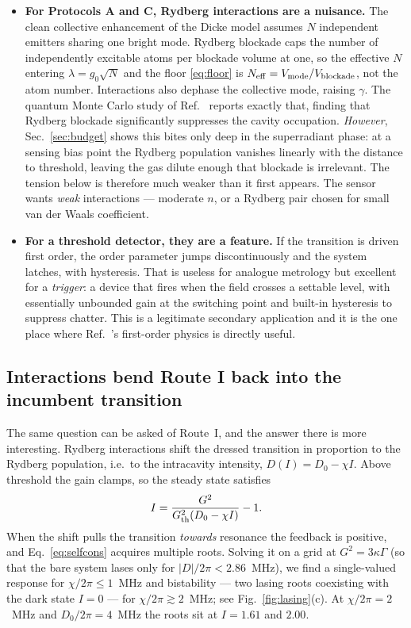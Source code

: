 \documentclass[11pt,a4paper]{article}
\begin{document}
\begin{itemize}
  \item \textbf{For Protocols A and C, Rydberg interactions are a nuisance.} The clean
        collective enhancement of the Dicke model assumes $N$ independent emitters sharing
        one bright mode. Rydberg blockade caps the number of independently excitable atoms
        per blockade volume at one, so the effective $N$ entering $\lambda=g_0\sqrt{N}$ and
        the floor \eqref{eq:floor} is $N_{\rm eff} = V_{\rm mode}/V_{\rm blockade}$, not the
        atom number. Interactions also dephase the collective mode, raising $\gamma$. The
        quantum Monte Carlo study of Ref.~\cite{DickeIsing2025} reports exactly that,
        finding that Rydberg blockade significantly suppresses the cavity occupation.
        \emph{However}, Sec.~\ref{sec:budget} shows this bites only deep in the superradiant
        phase: at a sensing bias point the Rydberg population vanishes linearly with the
        distance to threshold, leaving the gas dilute enough that blockade is irrelevant. The
        tension below is therefore much weaker than it first appears.
        The sensor wants \emph{weak} interactions --- moderate $n$, or a Rydberg pair chosen
        for small van der Waals coefficient.
  \item \textbf{For a threshold detector, they are a feature.} If the transition is driven
        first order, the order parameter jumps discontinuously and the system latches, with
        hysteresis. That is useless for analogue metrology but excellent for a
        \emph{trigger}: a device that fires when the field crosses a settable level, with
        essentially unbounded gain at the switching point and built-in hysteresis to suppress
        chatter. This is a legitimate secondary application and it is the one place where
        Ref.~\cite{Zhang2013}'s first-order physics is directly useful.
\end{itemize}

\subsection{Interactions bend Route I back into the incumbent transition}
\label{sec:bridge}

The same question can be asked of Route~I, and the answer there is more interesting. Rydberg
interactions shift the dressed transition in proportion to the Rydberg population, i.e.\ to the
intracavity intensity, $D(I) = D_0 - \chi I$. Above threshold the gain clamps, so the
steady state satisfies
\begin{equation}
  I = \frac{G^2}{G^2_{\rm th}\!\left(D_0 - \chi I\right)} - 1 .
  \label{eq:selfcons}
\end{equation}
When the shift pulls the transition \emph{towards} resonance the feedback is positive, and
Eq.~\eqref{eq:selfcons} acquires multiple roots. Solving it on a grid at
$G^2 = 3\kappa\Gamma$ (so that the bare system lases only for $|D|/2\pi<2.86$~MHz), we find a
single-valued response for $\chi/2\pi \le 1$~MHz and bistability --- two lasing roots
coexisting with the dark state $I=0$ --- for $\chi/2\pi \gtrsim 2$~MHz; see
Fig.~\ref{fig:lasing}(c). At $\chi/2\pi=2$~MHz and $D_0/2\pi = 4$~MHz the roots sit at
$I = 1.61$ and $2.00$.
\end{document}
